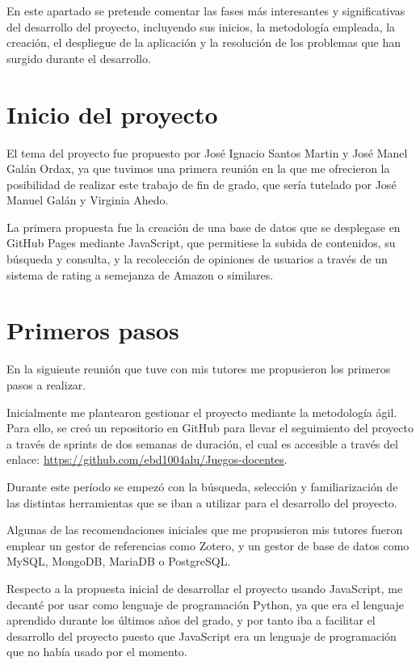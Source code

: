 
En este apartado se pretende comentar las fases más interesantes y significativas del desarrollo del proyecto, incluyendo sus inicios, la metodología empleada, la creación, el despliegue de la aplicación y la resolución de los problemas que han surgido durante el desarrollo. 


\section{Inicio del proyecto}
El tema del proyecto fue propuesto por José Ignacio Santos Martin y José Manel Galán Ordax, ya que tuvimos una primera reunión en la que me ofrecieron la posibilidad de realizar este trabajo de fin de grado, que sería tutelado por José Manuel Galán y Virginia Ahedo.

La primera propuesta fue la creación de una base de datos que se desplegase en GitHub Pages mediante JavaScript, que permitiese la subida de contenidos, su búsqueda y consulta, y la recolección de opiniones de usuarios a través de un sistema de rating a semejanza de Amazon o similares.

\section {Primeros pasos}
En la siguiente reunión que tuve con mis tutores me propusieron los primeros pasos a realizar. 

Inicialmente me plantearon gestionar el proyecto mediante la metodología ágil. Para ello, se creó un repositorio en GitHub para llevar el seguimiento del proyecto a través de sprints de dos semanas de duración, el cual es accesible a través del enlace: \url{https://github.com/ebd1004alu/Juegos-docentes}.

Durante este período se empezó con la búsqueda, selección y familiarización de las distintas herramientas que se iban a utilizar para el desarrollo del proyecto. 

Algunas de las recomendaciones iniciales que me propusieron mis tutores fueron emplear un gestor de referencias como Zotero, y un gestor de base de datos como MySQL, MongoDB, MariaDB o PostgreSQL.

Respecto a la propuesta inicial de desarrollar el proyecto usando JavaScript, me decanté por usar como lenguaje de programación Python, ya que era el lenguaje aprendido durante los últimos años del grado, y por tanto iba a facilitar el desarrollo del proyecto puesto que JavaScript era un lenguaje de programación que no había usado por el momento.

